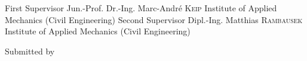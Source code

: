 \documentclass[paper=a4, fontsize=11pt]{scrartcl}
\begin{document}
\begin{titlePageST}
\begin{supervisorST}{2}%
\addSuper%
{First Supervisor}%
{Jun.-Prof. Dr.-Ing. Marc-Andr\'e \textsc{Keip}}%
{Institute of Applied Mechanics (Civil Engineering)}%
\addSuper%
{Second Supervisor}%
{Dipl.-Ing. Matthias \textsc{Rambausek}}%
{Institute of Applied Mechanics (Civil Engineering)}%
\end{supervisorST}%
\vspace{100pt}%
\begin{authorST}{Submitted by}%
\end{authorST}%
\end{titlePageST}
\end{document}
